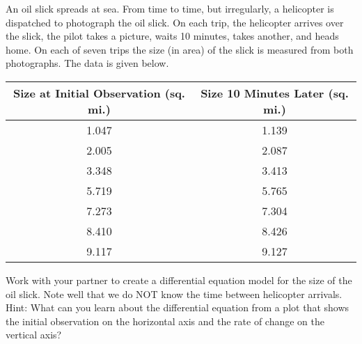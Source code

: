 \begin{problem}%
    An oil slick spreads at sea. From time to time, but irregularly, a helicopter is
    dispatched to photograph the oil slick. On each trip, the helicopter arrives over the
    slick, the pilot takes a picture, waits 10 minutes, takes another, and heads home. On
    each of seven trips the size (in area) of the slick is measured from both photographs.
    The data is given below.
    \begin{center}
        \begin{tabular}{|c|c|}
            \hline
            Size at Initial Observation (sq. mi.)  & Size 10 Minutes Later (sq. mi.) \\ \hline \hline
            1.047 & 1.139 \\
            2.005 & 2.087 \\
            3.348 & 3.413 \\
            5.719 & 5.765 \\
            7.273 & 7.304 \\
            8.410 & 8.426 \\
            9.117 & 9.127 \\ \hline
        \end{tabular}
    \end{center}
    Work with your partner to create a differential equation model for the size of the oil
    slick.  Note well that we do NOT know the time between helicopter arrivals. \\Hint:
    What can you learn about the differential equation from a plot that shows the initial
    observation on the horizontal axis and the rate of change on the vertical axis?  
\end{problem}


